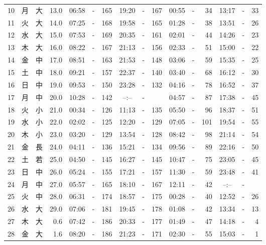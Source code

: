 \documentclass[12pt.a4j]{jsarticle}
\begin{document}
\begin{center}
\begin{table}[ht]
\begin{tabular}{|rc|cr|ccrccr|ccrccr|}
10 & 月 & 大 & 13.0 &  06:58 &-& 165  &  19:20 &-& 167  &   00:55 &-&  34  &   13:17 &-&  33  \\
11 & 火 & 大 & 14.0 &  07:25 &-& 168  &  19:58 &-& 165  &   01:28 &-&  38  &   13:51 &-&  26  \\
12 & 水 & 大 & 15.0 &  07:53 &-& 169  &  20:35 &-& 161  &   02:01 &-&  44  &   14:26 &-&  23  \\
13 & 木 & 大 & 16.0 &  08:22 &-& 167  &  21:13 &-& 156  &   02:33 &-&  51  &   15:00 &-&  22  \\
14 & 金 & 中 & 17.0 &  08:51 &-& 163  &  21:53 &-& 148  &   03:06 &-&  59  &   15:35 &-&  25  \\
15 & 土 & 中 & 18.0 &  09:21 &-& 157  &  22:37 &-& 140  &   03:40 &-&  68  &   16:12 &-&  30  \\
16 & 日 & 中 & 19.0 &  09:53 &-& 150  &  23:28 &-& 132  &   04:16 &-&  78  &   16:52 &-&  37  \\
17 & 月 & 中 & 20.0 &  10:28 &-& 142  &  --:-- &-&     &   04:57 &-&  87  &   17:38 &-&  45  \\
18 & 火 & 小 & 21.0 &  00:34 &-& 126  &  11:13 &-& 135  &   05:50 &-&  96  &   18:37 &-&  51  \\
19 & 水 & 小 & 22.0 &  02:02 &-& 125  &  12:20 &-& 129  &   07:05 &-& 101  &   19:54 &-&  55  \\
20 & 木 & 小 & 23.0 &  03:20 &-& 129  &  13:54 &-& 128  &   08:42 &-&  98  &   21:14 &-&  54  \\
21 & 金 & 長 & 24.0 &  04:11 &-& 136  &  15:21 &-& 134  &   09:56 &-&  89  &   22:16 &-&  50  \\
22 & 土 & 若 & 25.0 &  04:50 &-& 145  &  16:27 &-& 145  &   10:47 &-&  75  &   23:05 &-&  45  \\
23 & 日 & 中 & 26.0 &  05:24 &-& 155  &  17:21 &-& 157  &   11:30 &-&  59  &   23:48 &-&  41  \\
24 & 月 & 中 & 27.0 &  05:57 &-& 165  &  18:10 &-& 167  &   12:11 &-&  42  &   --:-- &-&     \\
25 & 火 & 中 & 28.0 &  06:31 &-& 174  &  18:57 &-& 175  &   00:28 &-&  40  &   12:52 &-&  26  \\
26 & 水 & 大 & 29.0 &  07:06 &-& 181  &  19:45 &-& 178  &   01:08 &-&  42  &   13:34 &-&  13  \\
27 & 木 & 大 &  0.6 &  07:42 &-& 186  &  20:33 &-& 177  &   01:49 &-&  47  &   14:18 &-&   4  \\
28 & 金 & 大 &  1.6 &  08:20 &-& 186  &  21:23 &-& 171  &   02:30 &-&  55  &   15:03 &-&   1  \\

\end{tabular}
\end{table}
\end{center}
\end{document}
